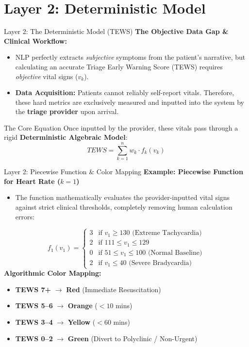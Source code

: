 \documentclass[11pt, aspectratio=169]{beamer}
\begin{document}
\section{Layer 2: Deterministic Model}
\begin{frame}{Layer 2: The Deterministic Model (TEWS)}
	\textbf{The Objective Data Gap \& Clinical Workflow:}
	\begin{itemize}
		\item NLP perfectly extracts \textit{subjective} symptoms from the patient's narrative, but calculating an accurate Triage Early Warning Score (TEWS) requires \textit{objective} vital signs ($v_k$).
		\item \textbf{Data Acquisition:} Patients cannot reliably self-report vitals. Therefore, these hard metrics are exclusively measured and inputted into the system by the \textbf{triage provider} upon arrival.
	\end{itemize}
	\vspace{0.1cm}
	
	\begin{block}{The Core Equation}
		Once inputted by the provider, these vitals pass through a rigid \textbf{Deterministic Algebraic Model}:
		\[
		TEWS = \sum_{k=1}^{n} w_k \cdot f_k(v_k)
		\]
	\end{block}
\end{frame}

\begin{frame}{Layer 2: Piecewise Function \& Color Mapping}
	\textbf{Example: Piecewise Function for Heart Rate ($k=1$)}
	\begin{itemize}
		\item The function mathematically evaluates the provider-inputted vital signs against strict clinical thresholds, completely removing human calculation errors:
	\end{itemize}
	\[
	f_1(v_1) = \begin{cases}
		3 & \text{if } v_1 \ge 130 \text{ (Extreme Tachycardia)} \\
		2 & \text{if } 111 \le v_1 \le 129 \\
		0 & \text{if } 51 \le v_1 \le 100 \text{ (Normal Baseline)} \\
		2 & \text{if } v_1 \le 40 \text{ (Severe Bradycardia)}
	\end{cases}
	\]
	\vspace{0.1cm}
	\textbf{Algorithmic Color Mapping:}
	\begin{itemize}
		\item \textbf{\textcolor{triageRed}{TEWS 7+}} $\rightarrow$ \textbf{Red} (Immediate Resuscitation)
		\item \textbf{\textcolor{triageOrange}{TEWS 5--6}} $\rightarrow$ \textbf{Orange} ($<10$ mins)
		\item \textbf{\textcolor{triageYellow}{TEWS 3--4}} $\rightarrow$ \textbf{Yellow} ($<60$ mins)
		\item \textbf{\textcolor{triageGreen}{TEWS 0--2}} $\rightarrow$ \textbf{Green} (Divert to Polyclinic / Non-Urgent)
	\end{itemize}
\end{frame}
\end{document}
